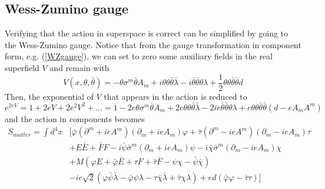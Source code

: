 \documentclass[a4paper,12pt]{article}
\numberwithin{equation}{section}
\numberwithin{exe}{section}
\newcommand{\p}{{\partial}}
\newcommand{\Fb}{{\bar F}}
\renewcommand{\a}{{\alpha}}
\renewcommand{\l}{{\lambda}}
\newcommand{\lb}{{\bar\lambda}}
\newcommand{\s}{{\sigma}}
\renewcommand{\sb}{{\bar\sigma}}
\renewcommand{\t}{{\theta}}
\newcommand{\tb}{{\bar\theta}}
\newcommand{\vphi}{{\varphi}}
\newcommand{\vphib}{{\bar\varphi}}
\newcommand{\chib}{{\bar\chi}}
\newcommand{\taub}{{\bar\tau}}
\newcommand{\psib}{{\bar\psi}}
\begin{document}
\subsection{Wess-Zumino gauge}
Verifying that the action in superspace is correct can be simplified by going to the Wess-Zumino gauge. Notice that from the gauge transformation in component form, e.g. (\ref{WZgauge}), we can set to zero some auxiliary fields in the real superfield $V$ and remain with
	\begin{equation}
	V(x,\t,\tb) = -\t\s^m\tb A_m + i\t\t\tb\lb -i\tb\tb\t\l + \frac12 \t\t\tb\tb d
	\end{equation}
Then, the exponential of $V$ that appears in the action is reduced to
	\begin{equation}
	e^{2eV} = 1 + 2eV + 2e^2 V^2 + \ldots = 1- 2e\t\s^m\tb A_m + 2e\t\t\tb\lb -2ie\tb\tb\t\l + e\t\t\tb\tb (d-e A_m A^m)
	\end{equation}
and the action in components becomes
	\begin{align}
	S_{matter} = \int d^4x & \Big[ \vphib(\p^m + ieA^m)(\p_m + ieA_m)\vphi + \taub(\p^m-ie A^m)(\p_m-ie A_m)\tau \nonumber \\
	& + E \bar E + \Fb F - i\psib\sb^m(\p_m + ie A_m)\psi -i\chib \sb^m(\p_m - ie A_m)\chi \nonumber \\
	& + M (\vphi E+ \vphib \bar E + \tau F + \taub\Fb - \psi\chi - \psib \chib) \nonumber \\
	& -ie\sqrt2(\vphi\psib\lb - \vphib\psi\l - \tau\chib\lb + \taub\chi\l) + ed(\vphib\vphi -\taub\tau) \Big]
	\end{align}
%
%
\end{document}
